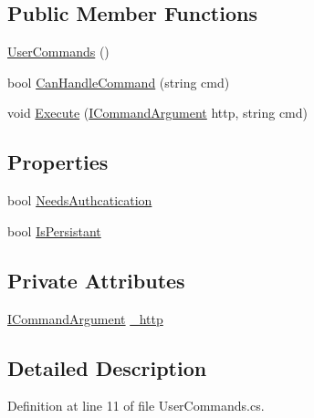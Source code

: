 \subsection*{Public Member Functions}
\begin{DoxyCompactItemize}
\item 
\hyperlink{class_damp_server_1_1_user_commands_acf2a3c1f600b55abe0daefd652713e25}{User\-Commands} ()
\item 
bool \hyperlink{class_damp_server_1_1_user_commands_aad1c2749313df8161a3a7c09a1f7e78e}{Can\-Handle\-Command} (string cmd)
\item 
void \hyperlink{class_damp_server_1_1_user_commands_a5ddd3430091d6453079e689ca868d5ef}{Execute} (\hyperlink{interface_damp_server_1_1_i_command_argument}{I\-Command\-Argument} http, string cmd)
\end{DoxyCompactItemize}
\subsection*{Properties}
\begin{DoxyCompactItemize}
\item 
bool \hyperlink{class_damp_server_1_1_user_commands_ae868b059adcb74a836a6a5803613ce98}{Needs\-Authcatication}
\item 
bool \hyperlink{class_damp_server_1_1_user_commands_a0c1097c5031c855e21823cd62a882fbf}{Is\-Persistant}
\end{DoxyCompactItemize}
\subsection*{Private Attributes}
\begin{DoxyCompactItemize}
\item 
\hyperlink{interface_damp_server_1_1_i_command_argument}{I\-Command\-Argument} \hyperlink{class_damp_server_1_1_user_commands_a51b4519fa4977b0f2e5a822d00ce6202}{\-\_\-http}
\end{DoxyCompactItemize}


\subsection{Detailed Description}


Definition at line 11 of file User\-Commands.\-cs.



